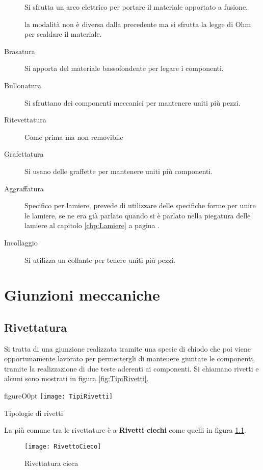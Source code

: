 \begin{description}
\item[] Si sfrutta un arco elettrico per portare il materiale apportato a fusione.
\item[] la modalità non è diversa dalla precedente ma si sfrutta la legge di Ohm per scaldare il materiale.
\item[Brasatura] Si apporta del materiale bassofondente per legare i componenti.
\item[Bullonatura] Si sfruttano dei componenti meccanici per mantenere uniti più pezzi.
\item[Ritevettatura] Come prima ma non removibile
\item[Grafettatura] Si usano delle graffette per mantenere uniti più componenti.
\item[Aggraffatura] Specifico per lamiere, prevede di utilizzare delle specifiche forme per unire le lamiere, se ne era già parlato quando si è parlato nella piegatura delle lamiere al capitolo \ref{chp:Lamiere} a pagina \pageref{chp:Lamiere}.
\item[Incollaggio] Si utilizza un collante per tenere uniti più pezzi.
\end{description}

\chapter{Giunzioni meccaniche}
\section{Rivettatura}
Si tratta di una giunzione realizzata tramite una specie di chiodo che poi viene opportunamente lavorato per permettergli di mantenere giuntate le componenti, tramite la realizzazione di due teste aderenti ai componenti.
Si chiamano rivetti e alcuni sono mostrati in figura \ref{fig:TipiRivetti}.

\begin{wrapfloat}{figure}{O}{0pt}
\texttt{[image: TipiRivetti]}
\caption{Tipologie di rivetti}
\label{fig:TipiRivetti}
\end{wrapfloat}

La più comune tra le rivettature è a \textbf{Rivetti ciechi} come quelli in figura \ref{fig:RivettoCieco}.

\begin{figure}
\centering
\texttt{[image: RivettoCieco]}
\caption{Rivettatura cieca}
\label{fig:RivettoCieco}
\end{figure}

